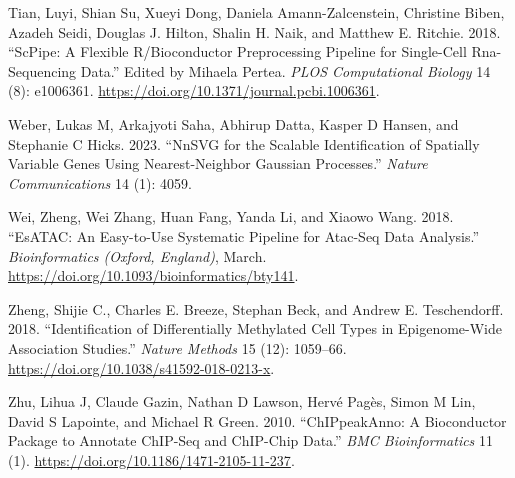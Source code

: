 \begin{thebibliography}{99.}
Tian, Luyi, Shian Su, Xueyi Dong, Daniela Amann-Zalcenstein, Christine Biben, Azadeh Seidi, Douglas J. Hilton, Shalin H. Naik, and Matthew E. Ritchie. 2018. ``ScPipe: A Flexible R/Bioconductor Preprocessing Pipeline for Single-Cell Rna-Sequencing Data.'' Edited by Mihaela Pertea. \emph{PLOS Computational Biology} 14 (8): e1006361. \url{https://doi.org/10.1371/journal.pcbi.1006361}.

Weber, Lukas M, Arkajyoti Saha, Abhirup Datta, Kasper D Hansen, and Stephanie C Hicks. 2023. ``NnSVG for the Scalable Identification of Spatially Variable Genes Using Nearest-Neighbor Gaussian Processes.'' \emph{Nature Communications} 14 (1): 4059.

Wei, Zheng, Wei Zhang, Huan Fang, Yanda Li, and Xiaowo Wang. 2018. ``EsATAC: An Easy-to-Use Systematic Pipeline for Atac-Seq Data Analysis.'' \emph{Bioinformatics (Oxford, England)}, March. \url{https://doi.org/10.1093/bioinformatics/bty141}.

Zheng, Shijie C., Charles E. Breeze, Stephan Beck, and Andrew E. Teschendorff. 2018. ``Identification of Differentially Methylated Cell Types in Epigenome-Wide Association Studies.'' \emph{Nature Methods} 15 (12): 1059--66. \url{https://doi.org/10.1038/s41592-018-0213-x}.

Zhu, Lihua J, Claude Gazin, Nathan D Lawson, Hervé Pagès, Simon M Lin, David S Lapointe, and Michael R Green. 2010. ``ChIPpeakAnno: A Bioconductor Package to Annotate ChIP-Seq and ChIP-Chip Data.'' \emph{BMC Bioinformatics} 11 (1). \url{https://doi.org/10.1186/1471-2105-11-237}.

\end{thebibliography}
